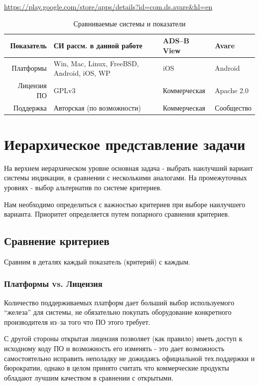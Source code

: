 \documentclass[a4paper,12pt]{report} %
\begin{document}
\url{https://play.google.com/store/apps/details?id=com.ds.avare&hl=en}


\begin{table}[!h]
  \caption{Сравниваемые системы и показатели}
  \begin{tabular}{ | r | p{6cm} | l | l |}
    \hline
    Показатель   & СИ рассм. в данной работе                  & ADS--B View   & Avare  \\
    \hline
    Платформы    & Win, Mac, Linux, FreeBSD, Android, iOS, WP & iOS           & Android \\
    \hline
    Лицензия ПО  & GPLv3                                      & Коммерческая  & Apache 2.0 \\
    \hline
    Поддержка    & Авторская (по возможности)                 & Коммерческая  & Сообщество \\
    \hline
  \end{tabular}
\end{table}

\section{Иерархическое представление задачи}

На верхнем иерархическом уровне основная задача - выбрать наилучший вариант
системы индикации, в сравнении с несколькими аналогами. На промежуточных уровнях
- выбор альтернатив по системе критериев.

Нам необходимо определиться с важностью критериев при выборе наилучшего
варианта. Приоритет определяется путем попарного сравнения критериев.

\subsection{Сравнение критериев}

Сравним в деталях каждый показатель (критерий) с каждым.
\subsubsection{Платформы vs. Лицензия}

Количество поддерживаемых платформ дает больший выбор используемого ``железа''
для системы, не обязательно покупать оборудование конкретного производителя
из--за того что ПО этого требует.

С другой стороны открытая лицензия позволяет (как правило) иметь доступ к
исходному коду ПО и возможность его изменять - это дает возможность
самостоятельно исправить неполадку не дожидаясь официальной тех.поддержки и
бюрократии, однако в целом принято считать что коммерческие продукты обладают
лучшим качеством в сравнении с открытыми.
\end{document}
